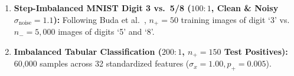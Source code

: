 \documentclass[10pt,a4paper]{article}
\begin{document}
\begin{enumerate}
\begin{itemize}
        \item \textit{Large-Scale Chromosome-Held-Out Split \& External Cohort Validation (HG006--HG007):} To evaluate cohort-scale generalization without sequence-homology leakage, 450,000 candidate windows ($177.6:1$ natural ratio, $p_+ = 0.0056$) are partitioned by chromosome (Chr 1--18 Train, Chr 19--20 Val, Chr 21--22 Test), with 50,000 independent windows from GIAB HG006--HG007 (Han Chinese Trio, Chr 21--22) reserved for external validation.
    \end{itemize}
    \item \textbf{Step-Imbalanced MNIST Digit 3 vs.\ 5/8 ($100:1$, Clean \& Noisy $\sigma_{\text{noise}}=1.1$):} Following Buda et al.~\cite{buda2018}, $n_+ = 50$ training images of digit `3' vs.\ $n_- = 5,000$ images of digits `5' and `8'.
    \item \textbf{Imbalanced Tabular Classification ($200:1$, $n_+ = 150$ Test Positives):} 60,000 samples across 32 standardized features ($\sigma_x = 1.00, p_+ = 0.005$).
\end{enumerate}
\end{document}
